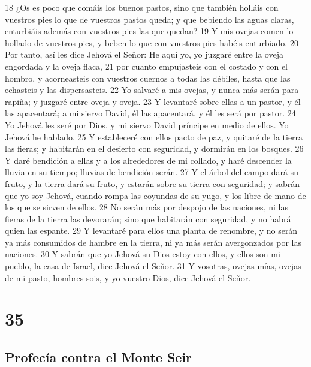 18 ¿Os es poco que comáis los buenos pastos, sino que también holláis con vuestros pies lo que de vuestros pastos queda; y que bebiendo las aguas claras, enturbiáis además con vuestros pies las que quedan?
19 Y mis ovejas comen lo hollado de vuestros pies, y beben lo que con vuestros pies habéis enturbiado.
20 Por tanto, así les dice Jehová el Señor: He aquí yo, yo juzgaré entre la oveja engordada y la oveja flaca,
21 por cuanto empujasteis con el costado y con el hombro, y acorneasteis con vuestros cuernos a todas las débiles, hasta que las echasteis y las dispersasteis.
22 Yo salvaré a mis ovejas, y nunca más serán para rapiña; y juzgaré entre oveja y oveja.
23 Y levantaré sobre ellas a un pastor, y él las apacentará; a mi siervo David, él las apacentará, y él les será por pastor. 
24 Yo Jehová les seré por Dios, y mi siervo David príncipe en medio de ellos. Yo Jehová he hablado.
25 Y estableceré con ellos pacto de paz, y quitaré de la tierra las fieras; y habitarán en el desierto con seguridad, y dormirán en los bosques.
26 Y daré bendición a ellas y a los alrededores de mi collado, y haré descender la lluvia en su tiempo; lluvias de bendición serán.
27 Y el árbol del campo dará su fruto, y la tierra dará su fruto, y estarán sobre su tierra con seguridad; y sabrán que yo soy Jehová, cuando rompa las coyundas de su yugo, y los libre de mano de los que se sirven de ellos.
28 No serán más por despojo de las naciones, ni las fieras de la tierra las devorarán; sino que habitarán con seguridad, y no habrá quien las espante.
29 Y levantaré para ellos una planta de renombre, y no serán ya más consumidos de hambre en la tierra, ni ya más serán avergonzados por las naciones.
30 Y sabrán que yo Jehová su Dios estoy con ellos, y ellos son mi pueblo, la casa de Israel, dice Jehová el Señor.
31 Y vosotras, ovejas mías, ovejas de mi pasto, hombres sois, y yo vuestro Dios, dice Jehová el Señor.

\chapter{35}

\section*{Profecía contra el Monte Seir}

